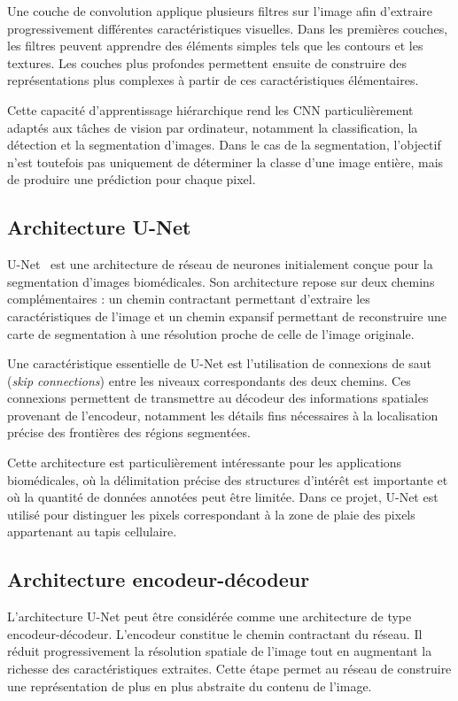 \documentclass[12pt,a4paper]{report}
\begin{document}
Une couche de convolution applique plusieurs filtres sur l'image afin d'extraire progressivement différentes caractéristiques visuelles. Dans les premières couches, les filtres peuvent apprendre des éléments simples tels que les contours et les textures. Les couches plus profondes permettent ensuite de construire des représentations plus complexes à partir de ces caractéristiques élémentaires.

Cette capacité d'apprentissage hiérarchique rend les CNN particulièrement adaptés aux tâches de vision par ordinateur, notamment la classification, la détection et la segmentation d'images. Dans le cas de la segmentation, l'objectif n'est toutefois pas uniquement de déterminer la classe d'une image entière, mais de produire une prédiction pour chaque pixel.

\subsection{Architecture U-Net}

U-Net~\cite{ref1} est une architecture de réseau de neurones initialement conçue pour la segmentation d'images biomédicales. Son architecture repose sur deux chemins complémentaires : un chemin contractant permettant d'extraire les caractéristiques de l'image et un chemin expansif permettant de reconstruire une carte de segmentation à une résolution proche de celle de l'image originale.

Une caractéristique essentielle de U-Net est l'utilisation de connexions de saut (\textit{skip connections}) entre les niveaux correspondants des deux chemins. Ces connexions permettent de transmettre au décodeur des informations spatiales provenant de l'encodeur, notamment les détails fins nécessaires à la localisation précise des frontières des régions segmentées.

Cette architecture est particulièrement intéressante pour les applications biomédicales, où la délimitation précise des structures d'intérêt est importante et où la quantité de données annotées peut être limitée. Dans ce projet, U-Net est utilisé pour distinguer les pixels correspondant à la zone de plaie des pixels appartenant au tapis cellulaire.

\subsection{Architecture encodeur-décodeur}

L'architecture U-Net peut être considérée comme une architecture de type encodeur-décodeur. L'encodeur constitue le chemin contractant du réseau. Il réduit progressivement la résolution spatiale de l'image tout en augmentant la richesse des caractéristiques extraites. Cette étape permet au réseau de construire une représentation de plus en plus abstraite du contenu de l'image.
\end{document}

